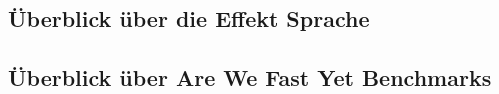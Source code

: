 \subsection{ Überblick über die Effekt Sprache  }	
\subsection{ Überblick über Are We Fast Yet Benchmarks }
 